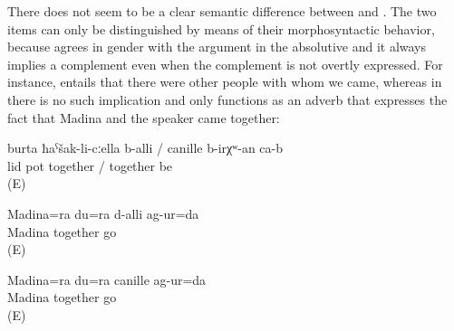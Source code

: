 There does not seem to be a clear semantic difference between  and  . The two items can only be distinguished by means of their morphosyntactic behavior, because  agrees in gender with the argument in the absolutive  and it always implies a complement even when the complement is not overtly expressed. For instance,  entails that there were other people with whom we came, whereas in  there is no such implication and  only functions as an adverb that expresses the fact that Madina and the speaker came together:
%
\begin{exe}
	\ex	\label{ex:‎The lid should be together with the pot}
	\gll	burta	ħaˁšak-li-cːella	b-alli	/	canille	b-irχʷ-an	ca-b\\
		lid	pot	together	/	together	be	\\
	\glt	{} (E)

	\ex	\label{ex:‎Madina and I came together (with somebody else / with other people)}
	\gll	Madina=ra	du=ra	d-alli	ag-ur=da\\
		Madina		together	go\\
	\glt	{} (E)

	\ex	\label{ex:‎Madina and I came together}
	\gll	Madina=ra	du=ra	canille	ag-ur=da\\
		Madina		together	go\\
	\glt	{} (E)
\end{exe}

